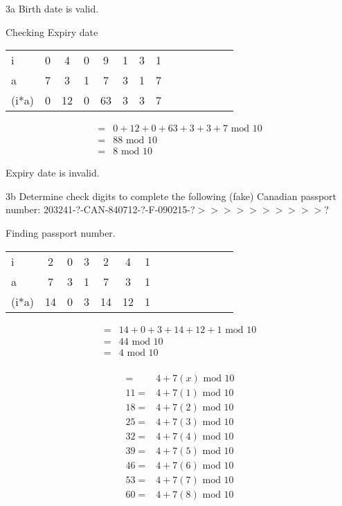 \begin{question}{3a}
Birth date is valid.



Checking Expiry date

\begin{tabular}{l|ccccccccccccc}
\hline
i     & 0  & 4  & 0  & 9  & 1  & 3  & 1 \\
a     & 7  & 3  & 1  & 7  & 3  & 1  & 7 \\
\hline
(i*a) & 0  & 12 & 0  & 63 & 3  & 3  & 7 
\end{tabular}

\begin{align*}
=& 0  + 12 + 0  + 63 + 3  + 3  + 7  \textrm{ mod } 10\\
=& 88 \textrm{ mod } 10\\
=& 8 \textrm{ mod } 10
\end{align*}

Expiry date is invalid.





\begin{question}{3b} %
Determine check digits to complete the following (fake) Canadian passport number:
203241-?-CAN-840712-?-F-090215-?$>>>>>>>>>>$?

Finding passport number.

\begin{tabular}{l|ccccccccccccc}
\hline
i     & 2 & 0 & 3 & 2 & 4 & 1\\
a     & 7 & 3 & 1 & 7 & 3 & 1\\
\hline
(i*a) & 14& 0 & 3 & 14& 12& 1
\end{tabular}

\begin{align*}
=& 14+ 0 + 3 + 14+ 12+ 1 \textrm{ mod } 10\\
=& 44\textrm{ mod } 10\\
=& 4 \textrm{ mod } 10\\
\end{align*}

\begin{align*}
=& 4 + 7(x)\textrm{ mod } 10\\
11 =& 4 + 7(1)\textrm{ mod } 10\\
18 =& 4 + 7(2)\textrm{ mod } 10\\
25 =& 4 + 7(3)\textrm{ mod } 10\\
32 =& 4 + 7(4)\textrm{ mod } 10\\
39 =& 4 + 7(5)\textrm{ mod } 10\\
46 =& 4 + 7(6)\textrm{ mod } 10\\
53 =& 4 + 7(7)\textrm{ mod } 10\\
60 =& 4 + 7(8)\textrm{ mod } 10\\
\end{align*}


\end{question}
\end{question}
